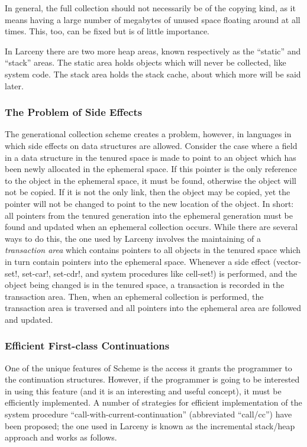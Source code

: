 In general, the full collection should not necessarily be of the copying
kind, as it means having a large number of megabytes of unused space
floating around at all times. This, too, can be fixed but is of little
importance.

In Larceny there are two more heap areas, known respectively as the
``static'' and ``stack'' areas. The static area holds objects which
will never be collected, like system code. The stack area holds the
stack cache, about which more will be said later.

\subsubsection{The Problem of Side Effects}

The generational collection scheme creates a problem, however, in
languages in which side effects on data structures are allowed.
Consider the case where a field in a data structure in the tenured
space is made to point to an object which has been newly allocated in
the ephemeral space. If this pointer is the only reference to the
object in the ephemeral space, it must be found, otherwise the object
will not be copied. If it is not the only link, then the object may be
copied, yet the pointer will not be changed to point to the new
location of the object. In short: all pointers from the tenured
generation into the ephemeral generation must be found and updated
when an ephemeral collection occurs. While there are several ways to
do this, the one used by Larceny involves the maintaining of a
{\em transaction area} which contains pointers to all objects in the
tenured space which in turn contain pointers into the ephemeral space.
Whenever a side effect (vector-set!, set-car!, set-cdr!, and system
procedures like cell-set!) is performed, and the object being changed
is in the tenured space, a transaction is recorded in the transaction
area. Then, when an ephemeral collection is performed, the transaction
area is traversed and all pointers into the ephemeral area are followed
and updated.

\subsubsection{Efficient First-class Continuations}

One of the unique features of Scheme is the access it grants the
programmer to the continuation structures. However, if the programmer
is going to be interested in using this feature (and it is an
interesting and useful concept), it must be efficiently implemented.
A number of strategies for efficient implementation of the system
procedure ``call-with-current-continuation'' (abbreviated ``call/cc'')
have been proposed; the one used in Larceny is known as the incremental
stack/heap approach and works as follows.

